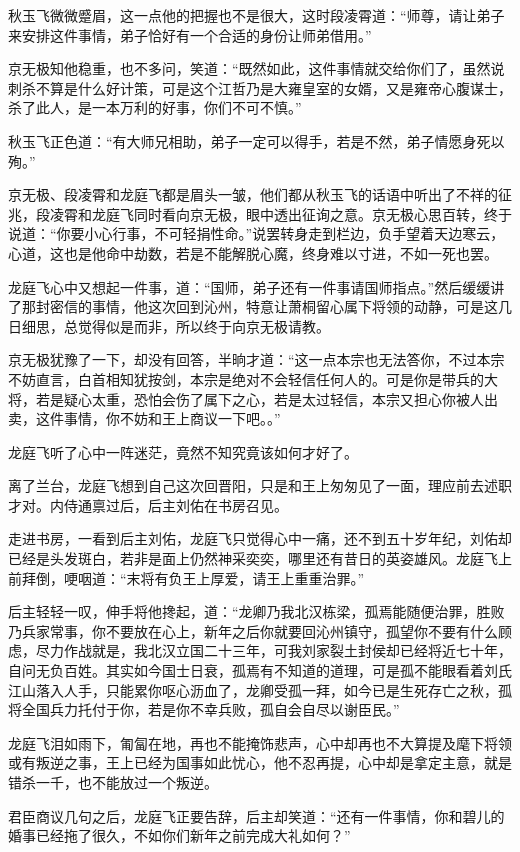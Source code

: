 秋玉飞微微蹙眉，这一点他的把握也不是很大，这时段凌霄道：“师尊，请让弟子来安排这件事情，弟子恰好有一个合适的身份让师弟借用。”

京无极知他稳重，也不多问，笑道：“既然如此，这件事情就交给你们了，虽然说刺杀不算是什么好计策，可是这个江哲乃是大雍皇室的女婿，又是雍帝心腹谋士，杀了此人，是一本万利的好事，你们不可不慎。”

秋玉飞正色道：“有大师兄相助，弟子一定可以得手，若是不然，弟子情愿身死以殉。”

京无极、段凌霄和龙庭飞都是眉头一皱，他们都从秋玉飞的话语中听出了不祥的征兆，段凌霄和龙庭飞同时看向京无极，眼中透出征询之意。京无极心思百转，终于说道：“你要小心行事，不可轻捐性命。”说罢转身走到栏边，负手望着天边寒云，心道，这也是他命中劫数，若是不能解脱心魔，终身难以寸进，不如一死也罢。

龙庭飞心中又想起一件事，道：“国师，弟子还有一件事请国师指点。”然后缓缓讲了那封密信的事情，他这次回到沁州，特意让萧桐留心属下将领的动静，可是这几日细思，总觉得似是而非，所以终于向京无极请教。

京无极犹豫了一下，却没有回答，半晌才道：“这一点本宗也无法答你，不过本宗不妨直言，白首相知犹按剑，本宗是绝对不会轻信任何人的。可是你是带兵的大将，若是疑心太重，恐怕会伤了属下之心，若是太过轻信，本宗又担心你被人出卖，这件事情，你不妨和王上商议一下吧。。”

龙庭飞听了心中一阵迷茫，竟然不知究竟该如何才好了。

离了兰台，龙庭飞想到自己这次回晋阳，只是和王上匆匆见了一面，理应前去述职才对。内侍通禀过后，后主刘佑在书房召见。

走进书房，一看到后主刘佑，龙庭飞只觉得心中一痛，还不到五十岁年纪，刘佑却已经是头发斑白，若非是面上仍然神采奕奕，哪里还有昔日的英姿雄风。龙庭飞上前拜倒，哽咽道：“末将有负王上厚爱，请王上重重治罪。”

后主轻轻一叹，伸手将他搀起，道：“龙卿乃我北汉栋梁，孤焉能随便治罪，胜败乃兵家常事，你不要放在心上，新年之后你就要回沁州镇守，孤望你不要有什么顾虑，尽力作战就是，我北汉立国二十三年，可我刘家裂土封侯却已经将近七十年，自问无负百姓。其实如今国士日衰，孤焉有不知道的道理，可是孤不能眼看着刘氏江山落入人手，只能累你呕心沥血了，龙卿受孤一拜，如今已是生死存亡之秋，孤将全国兵力托付于你，若是你不幸兵败，孤自会自尽以谢臣民。”

龙庭飞泪如雨下，匍匐在地，再也不能掩饰悲声，心中却再也不大算提及麾下将领或有叛逆之事，王上已经为国事如此忧心，他不忍再提，心中却是拿定主意，就是错杀一千，也不能放过一个叛逆。

君臣商议几句之后，龙庭飞正要告辞，后主却笑道：“还有一件事情，你和碧儿的婚事已经拖了很久，不如你们新年之前完成大礼如何？”

